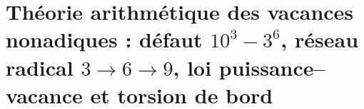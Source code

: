 \HMTFlushCurrentChapter
\chapter{Théorie arithmétique des vacances nonadiques : défaut \texorpdfstring{\(10^3-3^6\)}{10^3-3^6}, réseau radical \(3\to6\to9\), loi puissance--vacance et torsion de bord}%
\begingroup
\renewcommand{\chapter}[2][]{}%
%
\endgroup

\HMTFlushCurrentChapter
\chapter{Constantes thermiques et rayonnement : Boltzmann, Wien, Stefan--Boltzmann et thermodynamique spectrale du gaz photonique}%
\begingroup
\renewcommand{\chapter}[2][]{}%
%
\endgroup

\HMTFlushCurrentChapter
\chapter{Constantes électrofaibles et mélange : déterminant angulaire, relation \(W/Z\), angle de Weinberg et réflexion rationnelle CKM}%
\begingroup
\renewcommand{\chapter}[2][]{}%
%
\endgroup

\HMTFlushCurrentChapter
\chapter{Dérivation intrinsèque de \(G\) et réciprocité contragrédiente \texorpdfstring{\(G\leftrightarrow\hbar\)}{G<->hbar}: fermeture de phase, échelles de Compton et de Planck et invariance de \(G\hbar\)}%
\begingroup
\renewcommand{\chapter}[2][]{}%
%
\endgroup


